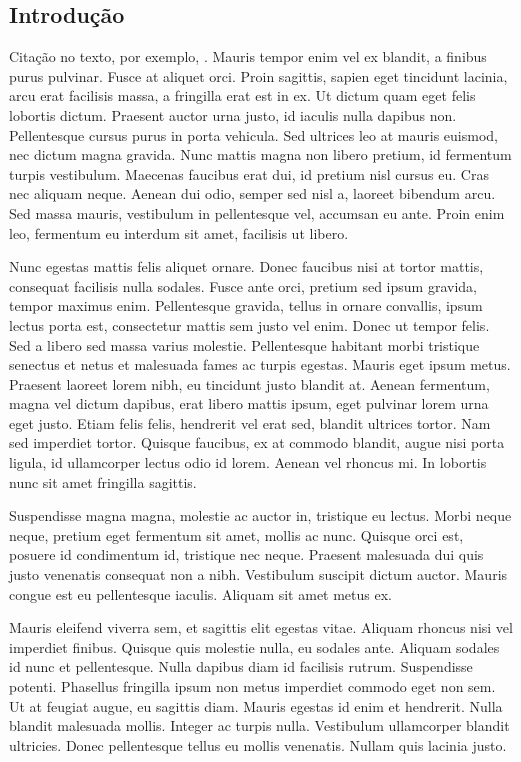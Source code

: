 \begin{btUnit}
\chapter{Introdução}

Citação no texto, por exemplo, \citet{Cockerham1996}. Mauris tempor
enim vel ex blandit, a finibus purus pulvinar. Fusce at aliquet orci.
Proin sagittis, sapien eget tincidunt lacinia, arcu erat facilisis
massa, a fringilla erat est in ex. Ut dictum quam eget felis lobortis
dictum. Praesent auctor urna justo, id iaculis nulla dapibus non.
Pellentesque cursus purus in porta vehicula. Sed ultrices leo at
mauris euismod, nec dictum magna gravida. Nunc mattis magna non libero
pretium, id fermentum turpis vestibulum. Maecenas faucibus erat dui,
id pretium nisl cursus eu. Cras nec aliquam neque. Aenean dui odio,
semper sed nisl a, laoreet bibendum arcu. Sed massa mauris, vestibulum
in pellentesque vel, accumsan eu ante. Proin enim leo, fermentum eu
interdum sit amet, facilisis ut libero.

Nunc egestas mattis felis aliquet ornare. Donec faucibus nisi at
tortor mattis, consequat facilisis nulla sodales. Fusce ante orci,
pretium sed ipsum gravida, tempor maximus enim. Pellentesque gravida,
tellus in ornare convallis, ipsum lectus porta est, consectetur mattis
sem justo vel enim. Donec ut tempor felis. Sed a libero sed massa
varius molestie. Pellentesque habitant morbi tristique senectus et
netus et malesuada fames ac turpis egestas. Mauris eget ipsum metus.
Praesent laoreet lorem nibh, eu tincidunt justo blandit at. Aenean
fermentum, magna vel dictum dapibus, erat libero mattis ipsum, eget
pulvinar lorem urna eget justo. Etiam felis felis, hendrerit vel erat
sed, blandit ultrices tortor. Nam sed imperdiet tortor. Quisque
faucibus, ex at commodo blandit, augue nisi porta ligula, id
ullamcorper lectus odio id lorem. Aenean vel rhoncus mi. In lobortis
nunc sit amet fringilla sagittis.

Suspendisse magna magna, molestie ac auctor in, tristique eu lectus.
Morbi neque neque, pretium eget fermentum sit amet, mollis ac nunc.
Quisque orci est, posuere id condimentum id, tristique nec neque.
Praesent malesuada dui quis justo venenatis consequat non a nibh.
Vestibulum suscipit dictum auctor. Mauris congue est eu pellentesque
iaculis. Aliquam sit amet metus ex.

Mauris eleifend viverra sem, et sagittis elit egestas vitae. Aliquam
rhoncus nisi vel imperdiet finibus. Quisque quis molestie nulla, eu
sodales ante. Aliquam sodales id nunc et pellentesque. Nulla dapibus
diam id facilisis rutrum. Suspendisse potenti. Phasellus fringilla
ipsum non metus imperdiet commodo eget non sem. Ut at feugiat augue,
eu sagittis diam. Mauris egestas id enim et hendrerit. Nulla blandit
malesuada mollis. Integer ac turpis nulla. Vestibulum ullamcorper
blandit ultricies. Donec pellentesque tellus eu mollis venenatis.
Nullam quis lacinia justo.


\end{btUnit}
